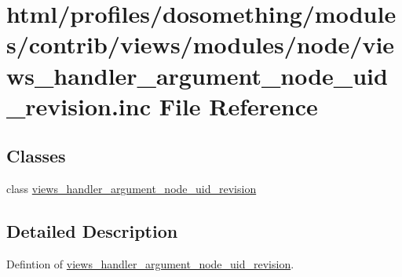 \hypertarget{views__handler__argument__node__uid__revision_8inc}{
\section{html/profiles/dosomething/modules/contrib/views/modules/node/views\_\-handler\_\-argument\_\-node\_\-uid\_\-revision.inc File Reference}
\label{views__handler__argument__node__uid__revision_8inc}
}
\subsection*{Classes}
\begin{DoxyCompactItemize}
\item 
class \hyperlink{classviews__handler__argument__node__uid__revision}{views\_\-handler\_\-argument\_\-node\_\-uid\_\-revision}
\end{DoxyCompactItemize}


\subsection{Detailed Description}
Defintion of \hyperlink{classviews__handler__argument__node__uid__revision}{views\_\-handler\_\-argument\_\-node\_\-uid\_\-revision}. 